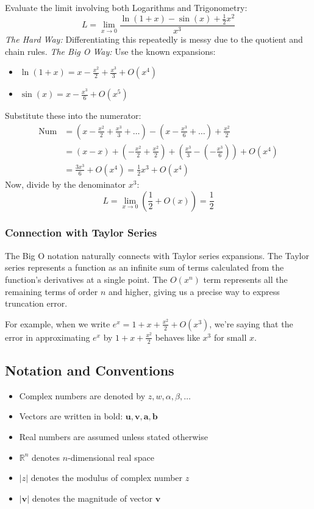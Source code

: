 \documentclass[12pt]{article}
\begin{document}
\vspace{1em}

\begin{example}

Evaluate the limit involving both Logarithms and Trigonometry:
\[ L = \lim_{x \to 0} \frac{\ln(1+x) - \sin(x) + \frac{1}{2}x^2}{x^3} \]
\textit{The Hard Way:} Differentiating this repeatedly is messy due to the quotient and chain rules.
\textit{The Big O Way:} Use the known expansions:
\begin{itemize}
    \item $\ln(1+x) = x - \frac{x^2}{2} + \frac{x^3}{3} + O(x^4)$
    \item $\sin(x) = x - \frac{x^3}{6} + O(x^5)$
\end{itemize}
Substitute these into the numerator:
\begin{align*}
    \text{Num} &= \left(x - \frac{x^2}{2} + \frac{x^3}{3} + \dots\right) - \left(x - \frac{x^3}{6} + \dots\right) + \frac{x^2}{2} \\
    &= \left(x - x\right) + \left(-\frac{x^2}{2} + \frac{x^2}{2}\right) + \left(\frac{x^3}{3} - (-\frac{x^3}{6})\right) + O(x^4) \\
    &= \frac{3x^3}{6} + O(x^4) = \frac{1}{2}x^3 + O(x^4)
\end{align*}
Now, divide by the denominator $x^3$:
\[ L = \lim_{x \to 0} \left( \frac{1}{2} + O(x) \right) = \frac{1}{2} \]
\end{example}

\subsubsection{Connection with Taylor Series}
The Big O notation naturally connects with Taylor series expansions. The Taylor series represents a function as an infinite sum of terms calculated from the function's derivatives at a single point. The $O(x^n)$ term represents all the remaining terms of order $n$ and higher, giving us a precise way to express truncation error.

For example, when we write $e^x = 1 + x + \frac{x^2}{2} + O(x^3)$, we're saying that the error in approximating $e^x$ by $1 + x + \frac{x^2}{2}$ behaves like $x^3$ for small $x$.

\subsection{Notation and Conventions}
\begin{itemize}[leftmargin=*]
  \item Complex numbers are denoted by $z, w, \alpha, \beta, \ldots$
  \item Vectors are written in bold: $\mathbf{u}, \mathbf{v}, \mathbf{a}, \mathbf{b}$
  \item Real numbers are assumed unless stated otherwise
  \item $\mathbb{R}^n$ denotes $n$-dimensional real space
  \item $|z|$ denotes the modulus of complex number $z$
  \item $|\mathbf{v}|$ denotes the magnitude of vector $\mathbf{v}$
\end{itemize}
\end{document}
